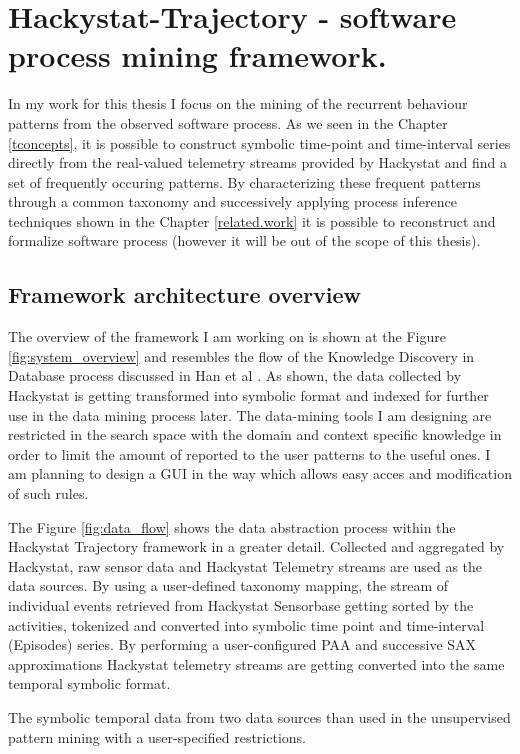 \chapter{Hackystat-Trajectory - software process mining framework.} \label{trajectory}
In my work for this thesis I focus on the mining of the recurrent behaviour patterns from the observed software process. As we seen in the Chapter \ref{tconcepts}, it is possible to construct symbolic time-point and time-interval series directly from the real-valued telemetry streams provided by Hackystat and find a set of frequently occuring patterns. By characterizing these frequent patterns through a common taxonomy and successively applying process inference techniques shown in the Chapter \ref{related.work} it is possible to reconstruct and formalize software process (however it will be out of the scope of this thesis).

\section{Framework architecture overview}
The overview of the framework I am working on is shown at the Figure \ref{fig:system_overview} and resembles the flow of the Knowledge Discovery in Database process discussed in Han et al \cite{citeulike:709476}. As shown, the data collected by Hackystat is getting transformed into symbolic format and indexed for further use in the data mining process later. The data-mining tools I am designing are restricted in the search space with the domain and context specific knowledge in order to limit the amount of reported to the user patterns to the useful ones. I am planning to design a GUI in the way which allows easy acces and modification of such rules. 

The Figure \ref{fig:data_flow} shows the data abstraction process within the Hackystat Trajectory framework in a greater detail. Collected and aggregated by Hackystat, raw sensor data and Hackystat Telemetry streams are used as the data sources. By using a user-defined taxonomy mapping, the stream of individual events retrieved from Hackystat Sensorbase getting sorted by the activities, tokenized and converted into symbolic time point and time-interval (Episodes) series. By performing a user-configured PAA and successive SAX approximations Hackystat telemetry streams are getting converted into the same temporal symbolic format.

The symbolic temporal data from two data sources than used in the unsupervised pattern mining with a user-specified restrictions. 

